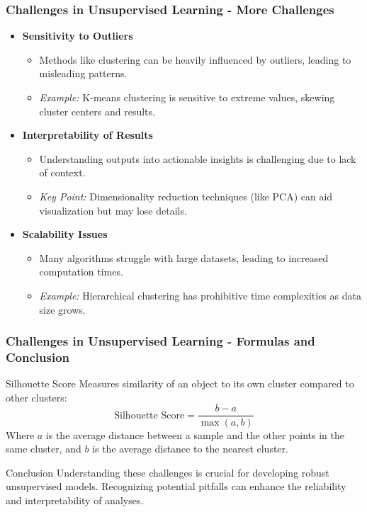 \documentclass[aspectratio=169]{beamer}
\begin{document}
\begin{frame}[fragile]
    \frametitle{Challenges in Unsupervised Learning - More Challenges}
    \begin{itemize}
        \item \textbf{Sensitivity to Outliers}
        \begin{itemize}
            \item Methods like clustering can be heavily influenced by outliers, leading to misleading patterns.
            \item \textit{Example:} K-means clustering is sensitive to extreme values, skewing cluster centers and results.
        \end{itemize}

        \item \textbf{Interpretability of Results}
        \begin{itemize}
            \item Understanding outputs into actionable insights is challenging due to lack of context.
            \item \textit{Key Point:} Dimensionality reduction techniques (like PCA) can aid visualization but may lose details.
        \end{itemize}

        \item \textbf{Scalability Issues}
        \begin{itemize}
            \item Many algorithms struggle with large datasets, leading to increased computation times.
            \item \textit{Example:} Hierarchical clustering has prohibitive time complexities as data size grows.
        \end{itemize}
    \end{itemize}
\end{frame}

\begin{frame}[fragile]
    \frametitle{Challenges in Unsupervised Learning - Formulas and Conclusion}
    \begin{block}{Silhouette Score}
    Measures similarity of an object to its own cluster compared to other clusters:
    \begin{equation}
    \text{Silhouette Score} = \frac{b - a}{\max(a, b)}
    \end{equation}
    Where \( a \) is the average distance between a sample and the other points in the same cluster, and \( b \) is the average distance to the nearest cluster.
    \end{block}
    
    \begin{block}{Conclusion}
    Understanding these challenges is crucial for developing robust unsupervised models. Recognizing potential pitfalls can enhance the reliability and interpretability of analyses.
    \end{block}
\end{frame}
\end{document}
